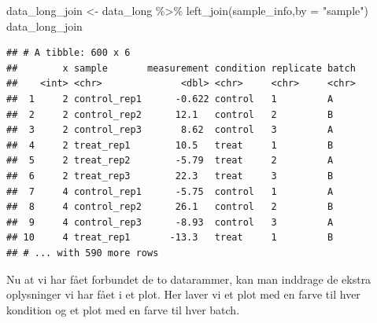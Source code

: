 \documentclass[
]{book}
\newenvironment{Shaded}{\begin{snugshade}}{\end{snugshade}}
\newcommand{\AttributeTok}[1]{\textcolor[rgb]{0.77,0.63,0.00}{#1}}
\newcommand{\FunctionTok}[1]{\textcolor[rgb]{0.00,0.00,0.00}{#1}}
\newcommand{\NormalTok}[1]{#1}
\newcommand{\OtherTok}[1]{\textcolor[rgb]{0.56,0.35,0.01}{#1}}
\newcommand{\SpecialCharTok}[1]{\textcolor[rgb]{0.00,0.00,0.00}{#1}}
\newcommand{\StringTok}[1]{\textcolor[rgb]{0.31,0.60,0.02}{#1}}
\begin{document}
\begin{Shaded}
\begin{Highlighting}[]
\NormalTok{data\_long\_join }\OtherTok{\textless{}{-}}\NormalTok{ data\_long  }\SpecialCharTok{\%\textgreater{}\%} \FunctionTok{left\_join}\NormalTok{(sample\_info,}\AttributeTok{by =} \StringTok{"sample"}\NormalTok{)}
\NormalTok{data\_long\_join}
\end{Highlighting}
\end{Shaded}

\begin{verbatim}
## # A tibble: 600 x 6
##        x sample       measurement condition replicate batch
##    <int> <chr>              <dbl> <chr>     <chr>     <chr>
##  1     2 control_rep1      -0.622 control   1         A    
##  2     2 control_rep2      12.1   control   2         B    
##  3     2 control_rep3       8.62  control   3         A    
##  4     2 treat_rep1        10.5   treat     1         B    
##  5     2 treat_rep2        -5.79  treat     2         A    
##  6     2 treat_rep3        22.3   treat     3         B    
##  7     4 control_rep1      -5.75  control   1         A    
##  8     4 control_rep2      26.1   control   2         B    
##  9     4 control_rep3      -8.93  control   3         A    
## 10     4 treat_rep1       -13.3   treat     1         B    
## # ... with 590 more rows
\end{verbatim}

Nu at vi har fået forbundet de to datarammer, kan man inddrage de ekstra oplysninger vi har fået i et plot. Her laver vi et plot med en farve til hver kondition og et plot med en farve til hver batch.
\end{document}
